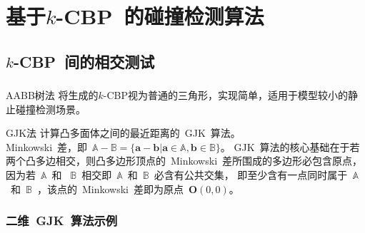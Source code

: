   \section{基于$k$-CBP~的碰撞检测算法}
    
      \subsection{$k$-CBP~间的相交测试}
      \begin{frame}
        \frametitle{}
        \begin{block}{AABB树法}
          将生成的$k$-CBP视为普通的三角形，实现简单，适用于模型较小的静止碰撞检测场景。
        \end{block}
        \begin{block}{GJK法}
          计算凸多面体之间的最近距离的~GJK~算法。\\
          Minkowski~差，即~$\mathbb{A} - \mathbb{B} = \{ \bm{a} - \bm{b} | \bm{a} \in \mathbb{A}, \bm{b} \in \mathbb{B}\} $。
GJK~算法的核心基础在于若两个凸多边相交，则凸多边形顶点的~Minkowski~差所围成的多边形必包含原点，因为若~$\mathbb{A}$~和
~$\mathbb{B}$~相交即~$\mathbb{A}$~和~$\mathbb{B}$~必含有公共交集，
即至少含有一点同时属于~$\mathbb{A}$~和~$\mathbb{B}$~，该点的~Minkowski~差即为原点~$\bm{O}(0, 0)$。
        \end{block}
      \end{frame}

      \begin{frame}
        \frametitle{二维~GJK~算法示例}
        \begin{figure}[htbp]
        \end{figure}
      \end{frame}

